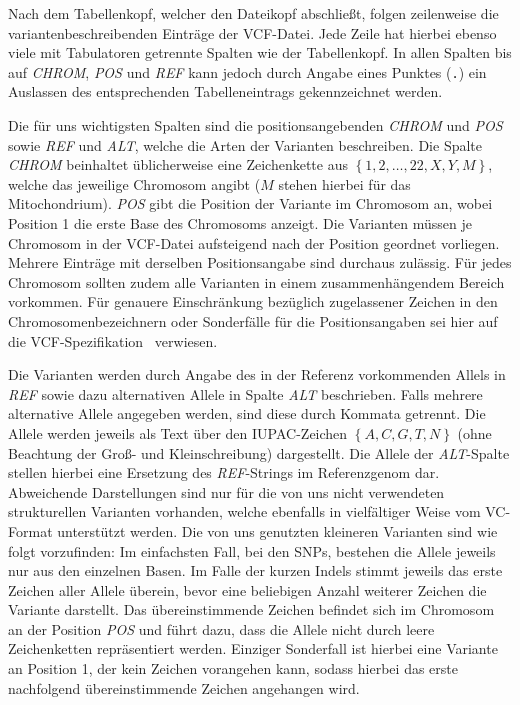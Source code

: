 Nach dem Tabellenkopf, welcher den Dateikopf abschließt, folgen zeilenweise die variantenbeschreibenden Einträge der VCF-Datei.
Jede Zeile hat hierbei ebenso viele mit Tabulatoren getrennte Spalten wie der Tabellenkopf.
In allen Spalten bis auf \emph{CHROM}, \emph{POS} und \emph{REF} kann jedoch durch Angabe eines Punktes (\texttt{.}) ein Auslassen des entsprechenden Tabelleneintrags gekennzeichnet werden.

Die für uns wichtigsten Spalten sind die positionsangebenden \emph{CHROM} und \emph{POS} sowie \emph{REF} und \emph{ALT}, welche die Arten der Varianten beschreiben.
Die Spalte \emph{CHROM} beinhaltet üblicherweise eine Zeichenkette aus $\left\{1,2,\dots,22,X,Y,M\right\}$, welche das jeweilige Chromosom angibt ($M$ stehen hierbei für das Mitochondrium).
\emph{POS} gibt die Position der Variante im Chromosom an, wobei Position 1 die erste Base des Chromosoms anzeigt.
Die Varianten müssen je Chromosom in der VCF-Datei aufsteigend nach der Position geordnet vorliegen.
Mehrere Einträge mit derselben Positionsangabe sind durchaus zulässig.
Für jedes Chromosom sollten zudem alle Varianten in einem zusammenhängendem Bereich vorkommen. %
Für genauere Einschränkung bezüglich zugelassener Zeichen in den Chromosomenbezeichnern oder Sonderfälle für die Positionsangaben sei hier auf die VCF-Spezifikation~\citep{vcfspec} verwiesen.

Die Varianten werden durch Angabe des in der Referenz vorkommenden Allels in \emph{REF} sowie dazu alternativen Allele in Spalte \emph{ALT} beschrieben.
Falls mehrere alternative Allele angegeben werden, sind diese durch Kommata getrennt.
Die Allele werden jeweils als Text über den IUPAC-Zeichen $\left\{A,C,G,T,N\right\}$ (ohne Beachtung der Groß- und Kleinschreibung) dargestellt.
Die Allele der \emph{ALT}-Spalte stellen hierbei eine Ersetzung des \emph{REF}-Strings im Referenzgenom dar.
Abweichende Darstellungen sind nur für die von uns nicht verwendeten strukturellen Varianten vorhanden, welche ebenfalls in vielfältiger Weise vom VC-Format unterstützt werden.
Die von uns genutzten kleineren Varianten sind wie folgt vorzufinden:
Im einfachsten Fall, bei den SNPs, bestehen die Allele jeweils nur aus den einzelnen Basen.
Im Falle der kurzen Indels stimmt jeweils das erste Zeichen aller Allele überein, bevor eine beliebigen Anzahl weiterer Zeichen die Variante darstellt.
Das übereinstimmende Zeichen befindet sich im Chromosom an der Position \textit{POS} und führt dazu, dass die Allele nicht durch leere Zeichenketten repräsentiert werden.
Einziger Sonderfall ist hierbei eine Variante an Position 1, der kein Zeichen vorangehen kann, sodass hierbei das erste nachfolgend übereinstimmende Zeichen angehangen wird.

